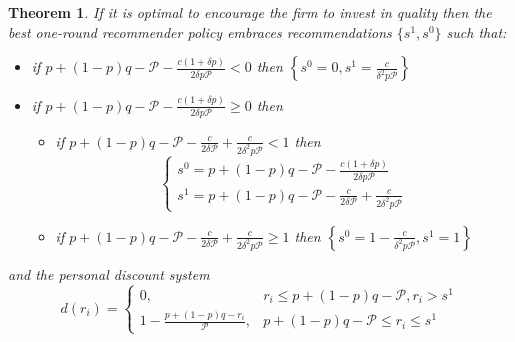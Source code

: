 \documentclass[a4paper]{article}
\newtheorem{theorem}{Theorem}
\begin{document}
\begin{theorem}
	If it is optimal to encourage the firm to invest in quality then the best one-round recommender policy embraces recommendations $\{s^1, s^0\}$ such that:
	\begin{itemize}
		\item if $p+(1-p)q - \mathcal{P} - \frac{c(1+\delta p)}{2\delta p \mathcal{P}} < 0$ then $\left\{s^0 = 0, s^1 = \frac{c}{\delta^2 p \mathcal{P}} \right\}$
		\item if  $p+(1-p)q - \mathcal{P} - \frac{c(1+\delta p)}{2\delta p \mathcal{P}} \ge 0$ then
		\begin{itemize}
			\item if $p+(1-p)q - \mathcal{P} - \frac{c}{2\delta \mathcal{P}} + \frac{c}{2\delta^2 p \mathcal{P}} < 1$ then $$\begin{cases}s^0 = p+(1-p)q - \mathcal{P} - \frac{c(1+\delta p)}{2\delta p \mathcal{P}}\\ s^1 = p+(1-p)q - \mathcal{P} - \frac{c}{2\delta \mathcal{P}} + \frac{c}{2\delta^2 p \mathcal{P}} \end{cases}$$
			\item if $p+(1-p)q - \mathcal{P} - \frac{c}{2\delta \mathcal{P}} + \frac{c}{2\delta^2 p \mathcal{P}} \ge 1$ then $\left\{s^0 = 1-\frac{c}{\delta^2 p \mathcal{P}}, s^1 =1 \right\}$
		\end{itemize}
	\end{itemize}
	
	
	
	
	
	and the personal discount system $$d(r_i) = \begin{cases}
	0, &r_i \le p + (1-p)q - \mathcal{P}, r_i > s^1\\
	1-\frac{p+(1-p)q - r_i}{\mathcal{P}}, &p + (1-p)q - \mathcal{P} \le r_i \le s^1
	\end{cases}$$
\end{theorem}
\end{document}
